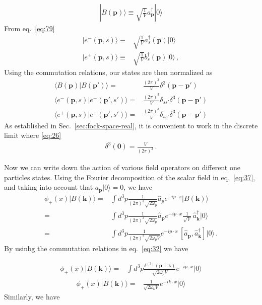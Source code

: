 \begin{align}
  | B(\mathbf{p})\rangle\equiv\sqrt{\frac{1}{V}}a^\dagger_{\mathbf{p}}|0\rangle 
\end{align}
From eq.~\eqref{eq:79} 
\begin{align}
  \label{eq:77}
   | e^-(\mathbf{p},s)\rangle\equiv&\sqrt{\frac{1}{V}}a^\dagger_s(\mathbf{p})|0\rangle\nonumber\\
   | e^+(\mathbf{p},s)\rangle\equiv&\sqrt{\frac{1}{V}}{b}^\dagger_s(\mathbf{p})|0\rangle\,, 
\end{align}
Using the commutation relations, our states are then normalized as
\begin{align}
\langle B(\mathbf{p})| B(\mathbf{p}')\rangle=&\frac{(2\pi)^3}{V}\delta^3(\mathbf{p}-\mathbf{p}')\nonumber\\
\langle e^-(\mathbf{p},s)| e^-(\mathbf{p}',s')\rangle=&\frac{(2\pi)^3}{V}\delta_{s s'}\delta^3(\mathbf{p}-\mathbf{p}')\nonumber\\
\langle e^+(\mathbf{p},s)| e^+(\mathbf{p}',s')\rangle=&\frac{(2\pi)^3}{V}\delta_{s s'}\delta^3(\mathbf{p}-\mathbf{p}')
\end{align}
As established in Sec.~\ref{sec:fock-space-real}, it is convenient to work in the discrete limit where \eqref{eq:26}
\begin{align}
   \delta^3(\mathbf{0})=\frac{V}{(2\pi)^3}\,.
\end{align}

Now we can write down the action of various field operators on different one particles states. 
Using the Fourier decomposition  of the scalar field in eq.~\eqref{eq:37}, and taking into account that 
$a_{\mathbf{p}}|0\rangle=0$, we have
\begin{align}
\label{eq:98}
   \phi_+(x)|B(\mathbf{k})\rangle=&\int d^3p \frac{1}{(2\pi)^3\sqrt{2\omega_{p} }}
\widehat{a}_{p} e^{-i p\cdot x }
|B(\mathbf{k})\rangle\nonumber\\
=&\int d^3p \frac{1}{(2\pi)^3\sqrt{2\omega_{p}}}
\widehat{a}_\mathbf{p} e^{-i p\cdot x }
\frac{1}{\sqrt{V}}\, \widehat{a}^\dagger_{\mathbf{k}}|0\rangle\nonumber\\
  =&\int d^3p \frac{1}{(2\pi)^3\sqrt{2\omega_{p}V}} e^{-i p\cdot x }
\, [\widehat{a}_{\mathbf{p}},\widehat{a}^\dagger_{\mathbf{k}}]|0\rangle\,.
\end{align}
By usinbg the commutation relations in eq.~\eqref{eq:32} we have

\begin{align}
\phi_+(x)|B(\mathbf{k})\rangle  
=&\int d^3p \frac{\delta^{(3)}(\mathbf{p}-\mathbf{k})}{\sqrt{2\omega_{p}V}}
 e^{-i p\cdot x }|0\rangle
\end{align}
\begin{align}
\phi_+(x)|B(\mathbf{k})\rangle  
=&\frac{1}{\sqrt{2\omega_{k}V}}e^{-i k\cdot x }|0\rangle
\end{align}
Similarly, we have


